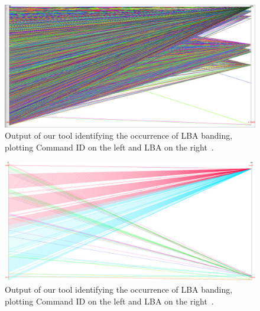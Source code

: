 \documentclass[12pt]{ucthesis}
\begin{document}
\clearpage

\begin{figure}[htb!]
 \centering
 \includegraphics[width=\textwidth]{images/lba_banding_full.jpg}
 \caption[Output of our tool identifying the occurrence of LBA banding.]{Output of our tool identifying the occurrence of LBA banding, plotting Command ID on the left and LBA on the right~\cite{internal:collab}.}
 \label{fig:lba_banding_full}
\end{figure}

\begin{figure}[htb!]
 \centering
 \includegraphics[width=\textwidth]{images/11.jpg}
 \caption[Output of our tool identifying the occurrence of LBA banding.]{Output of our tool identifying the occurrence of LBA banding, plotting Command ID on the left and LBA on the right~\cite{internal:collab}.}
 \label{fig:lba_banding}
\end{figure}
\end{document}

